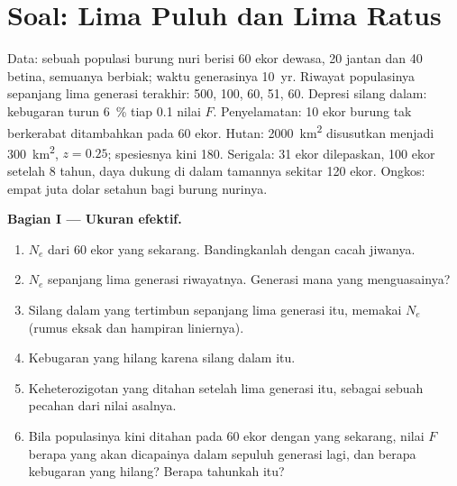\section{Soal: Lima Puluh dan Lima Ratus}

\begin{problem}
\label{pb:b3:conservation-biology:1}
Data: sebuah populasi burung nuri berisi 60 ekor dewasa, 20 jantan dan 40
betina, semuanya berbiak; waktu generasinya \qty{10}{yr}. Riwayat
populasinya sepanjang lima generasi terakhir: 500, 100, 60, 51, 60.
Depresi silang dalam: kebugaran turun \qty{6}{\%} tiap \qty{0.1}{} nilai
$F$. Penyelamatan: 10 ekor burung tak berkerabat ditambahkan pada 60 ekor.
Hutan: \qty{2000}{km^2} disusutkan menjadi \qty{300}{km^2}, $z = 0.25$;
spesiesnya kini 180. Serigala: 31 ekor dilepaskan, 100 ekor setelah 8
tahun, daya dukung di dalam tamannya sekitar 120 ekor. Ongkos: empat juta
dolar setahun bagi burung nurinya.

\medskip
\noindent\textbf{Bagian I --- Ukuran efektif.}
\begin{enumerate}
  \item $N_{e}$ dari  60 ekor yang sekarang. Bandingkanlah
        dengan cacah jiwanya.
  \item $N_{e}$  sepanjang lima generasi riwayatnya.
        Generasi mana yang menguasainya?
  \item Silang dalam yang tertimbun sepanjang lima generasi itu, memakai
        $N_{e}$  (rumus eksak dan hampiran liniernya).
  \item Kebugaran yang hilang karena silang dalam itu.
  \item Keheterozigotan yang ditahan setelah lima generasi itu, sebagai
        sebuah pecahan dari nilai asalnya.
  \item Bila populasinya kini ditahan pada 60 ekor dengan 
        yang sekarang, nilai $F$ berapa yang akan dicapainya dalam sepuluh
        generasi lagi, dan berapa kebugaran yang hilang? Berapa tahunkah itu?
\end{enumerate}


\end{problem}
